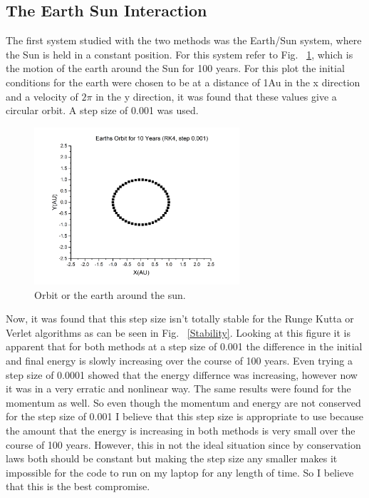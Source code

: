 \documentclass[12pt,righttag]{article}
\begin{document}
\subsection{The Earth Sun Interaction}
The first system studied with the two methods was the Earth/Sun system, where the Sun is held in a constant position. For this system refer to Fig. ~\ref{OrbitEarth}, which is the motion of the earth around the Sun for 100 years. For this plot the initial conditions for the earth were chosen to be at a distance of 1Au in the x direction and a velocity of $2\pi$ in the y direction, it was found that these values give a circular orbit. A step size of 0.001 was used.
\begin{figure}
	\begin{center}
		\includegraphics[width=3in]{Graph1.png}
		\caption{\label{OrbitEarth} Orbit or the earth around the sun. }
		\end{center}
	\end{figure}	
 Now, it was found that this step size isn't totally stable for the Runge Kutta or Verlet algorithms as can be seen in Fig. ~\ref{Stability}. Looking at this figure it is apparent that for both methods at a step size of 0.001 the difference in the initial and final energy is slowly increasing over the course of 100 years. Even trying a step size of 0.0001 showed that the energy differnce was increasing, however now it was in a very erratic and nonlinear way. The same results were found for the momentum as well. So even though the momentum and energy are not conserved for the step size of 0.001 I believe that this step size is appropriate to use because the amount that the energy is increasing in both methods is very small over the course of 100 years. However, this in not the ideal situation since by conservation laws both should be constant but making the step size any smaller makes it impossible for the code to run on my laptop for any length of time. So I believe that this is the best compromise.
\end{document}
